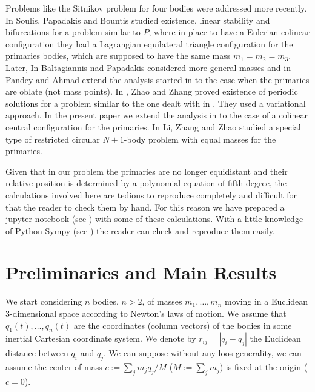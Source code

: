 \documentclass[twoside]{article}
\theoremstyle{remark}
\begin{document}
Problems like the Sitnikov problem for four bodies  were addressed more recently.
In \cite{soulis2008periodic} Soulis, Papadakis and Bountis studied existence, linear stability and bifurcations for a problem similar to $P$, where in place to have a Eulerian colinear configuration they had a Lagrangian equilateral triangle configuration for the primaries bodies, which are supposed to have the same mass $m_1=m_2=m_3$. Later, In \cite{baltagiannis2011families} Baltagiannis nad Papadakis considered more general masses and in \cite{pandey2013periodic} Pandey and Ahmad extend the analysis started in \cite{soulis2008periodic} to the case when the primaries are oblate (not mass points).
In \cite{zhao2015nonplanar}, Zhao and Zhang proved existence of periodic solutions for a problem similar to the one dealt with in \cite{soulis2008periodic}.  They used a variational approach. In the present paper we extend the analysis in \cite{zhao2015nonplanar} to the case of a colinear central configuration for the primaries.
In \cite{li2013characterization} Li, Zhang and Zhao studied a special type of
restricted circular $N+1$-body problem  with equal masses for the primaries. 

Given that in our problem the primaries are no longer equidistant and their relative 
position is determined by a polynomial equation of fifth degree, the calculations involved 
here are tedious to reproduce completely and difficult for that the reader to check them 
by hand. For this reason we have prepared a jupyter-notebook (see \cite{CalAux}) with some 
of these calculations. With a little knowledge of Python-Sympy (see \cite{sympy}) the reader 
can check and reproduce them easily.


\section{Preliminaries and Main Results}

We start considering $n$ bodies, $n>2$, of masses $m_1,\ldots,m_n$ moving in a Euclidean 3-dimensional space according to Newton's laws of motion. We assume that $q_1(t),\ldots,q_n(t)$ are the coordinates (column vectors) of the bodies in some inertial Cartesian coordinate system. We denote by $r_{ij}=|q_i-q_j|$  the  Euclidean distance between $q_i$ and $q_j$. We can suppose without any loos generality, we can assume the center of mass   $c:=\sum_jm_jq_j/M$ ($M:=\sum_j m_j$) is fixed at the origin ($c=0$).
\end{document}
